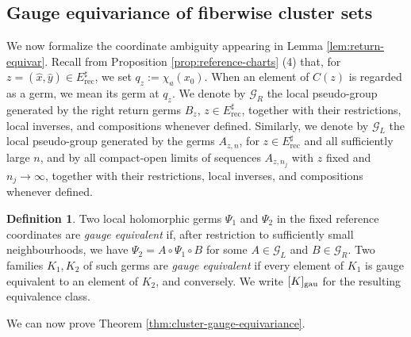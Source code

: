 \documentclass[11pt]{amsart}
\numberwithin{equation}{section}
\theoremstyle{plain}
\theoremstyle{definition}
\newtheorem{defn}[thm]{Definition}
\theoremstyle{remark}
\begin{document}
\subsection{Gauge equivariance of fiberwise cluster sets}
\label{subsec:gauge-equivariance}
We now formalize the coordinate ambiguity appearing in Lemma
\ref{lem:return-equivar}. Recall from Proposition
\ref{prop:reference-charts} (4) that, for
$z=(\hat x,\hat y)\in E^\sharp_{\mathrm{rec}}$, we set
$q_z:=\chi_a(x_0)$. When an element of $C(z)$ is regarded as a germ,
we mean its germ at $q_z$.
We denote by $\mathcal G_R$
the local pseudo-group generated by the right
return germs $B_z$,
$z\in E^\sharp_{\mathrm{rec}}$,
together with their restrictions, local inverses, and compositions
whenever defined. Similarly, 
we denote by $\mathcal G_L$
the local pseudo-group generated by the germs
$A_{z,n}$, for $z\in E^\sharp_{\mathrm{rec}}$ and all sufficiently
large $n$, and by all compact-open limits of sequences
$A_{z,n_j}$ with $z$ fixed and $n_j\to\infty$, together with their
restrictions, local inverses, and compositions whenever defined.

\begin{defn}\label{def:gauge-pgroup}
Two local holomorphic germs $\Psi_1$ and $\Psi_2$ in the fixed
reference coordinates are \emph{gauge equivalent} if, after
restriction to sufficiently small neighbourhoods, we have
$\Psi_2=A\circ\Psi_1\circ B$
for some $A\in\mathcal G_L$ and $B\in\mathcal G_R$.
Two families $K_1,K_2$ of such germs are
\emph{gauge equivalent} if every element of $K_1$ is gauge equivalent
to an element of $K_2$, and conversely. We write
$[K]_{\rm gau}$ for the resulting equivalence class.
\end{defn}

We can now prove Theorem \ref{thm:cluster-gauge-equivariance}.
\end{document}
